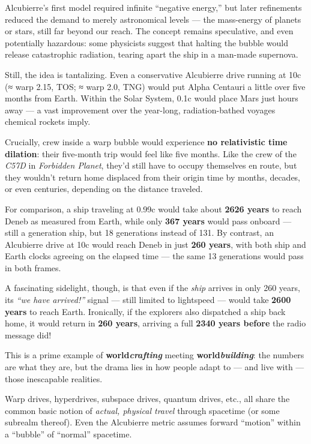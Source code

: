 \documentclass[
  letterpaper,
]{book}
\begin{document}
Alcubierre's first model required infinite ``negative energy,'' but
later refinements reduced the demand to merely astronomical levels ---
the mass-energy of planets or stars, still far beyond our reach. The
concept remains speculative, and even potentially hazardous: some
physicists suggest that halting the bubble would release catastrophic
radiation, tearing apart the ship in a man-made supernova.

Still, the idea is tantalizing. Even a conservative Alcubierre drive
running at 10c (≈ warp 2.15, TOS; ≈ warp 2.0, TNG) would put Alpha
Centauri a little over five months from Earth. Within the Solar System,
0.1c would place Mars just hours away --- a vast improvement over the
year-long, radiation-bathed voyages chemical rockets imply.

Crucially, crew inside a warp bubble would experience \textbf{no
relativistic time dilation}: their five-month trip would feel like five
months. Like the crew of the \emph{C57D} in \emph{Forbidden Planet},
they'd still have to occupy themselves en route, but they wouldn't
return home displaced from their origin time by months, decades, or even
centuries, depending on the distance traveled.

For comparison, a ship traveling at 0.99c would take about \textbf{2626
years} to reach Deneb as measured from Earth, while only \textbf{367
years} would pass onboard --- still a generation ship, but 18
generations instead of 131. By contrast, an Alcubierre drive at 10c
would reach Deneb in just \textbf{260 years}, with both ship and Earth
clocks agreeing on the elapsed time --- the same 13 generations would
pass in both frames.

A fascinating sidelight, though, is that even if the \emph{ship} arrives
in only 260 years, its \emph{``we have arrived!''} signal --- still
limited to lightspeed --- would take \textbf{2600 years} to reach Earth.
Ironically, if the explorers also dispatched a ship back home, it would
return in \textbf{260 years}, arriving a full \textbf{2340 years before}
the radio message did!

This is a prime example of \textbf{world\emph{crafting}} meeting
\textbf{world\emph{building}}: the numbers are what they are, but the
drama lies in how people adapt to --- and live with --- those
inescapable realities.

Warp drives, hyperdrives, subspace drives, quantum drives, etc., all
share the common basic notion of \emph{actual, physical travel} through
spacetime (or some subrealm thereof). Even the Alcubierre metric assumes
forward ``motion'' within a ``bubble'' of ``normal'' spacetime.
\end{document}
